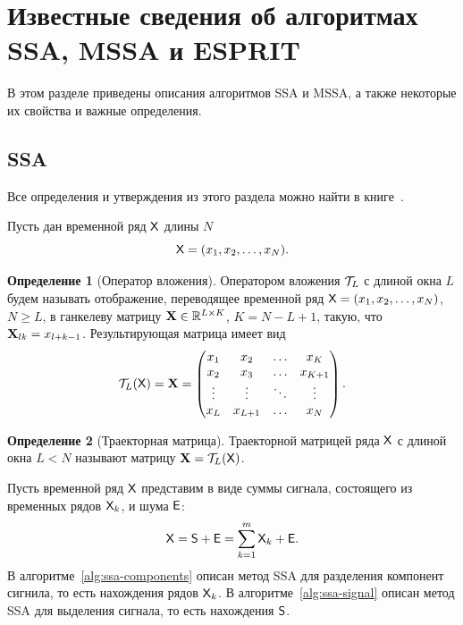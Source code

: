\documentclass[specialist,
  substylefile=spbu_report.rtx,
subf,href,colorlinks=true, 12pt]{disser}
\theoremstyle{plain}
\theoremstyle{definition}
\newtheorem{definition}{Определение}[section]
\theoremstyle{remark}
\begin{document}
\newpage

\section{Известные сведения об алгоритмах SSA, MSSA и
ESPRIT}\label{sec:known-results-ssa}
В этом разделе приведены описания алгоритмов SSA и MSSA, а также
некоторые их свойства и важные определения.

\subsection{SSA}\label{subsec:ssa}
Все определения и утверждения из этого раздела можно найти в книге~\cite{ssa}.

Пусть дан временной ряд $\mathsf{X}$ длины $N$
\[
  \mathsf{X}=(x_1,x_2,\ldots,x_N).
\]

\begin{definition}[Оператор вложения]
  \label{def:injection-op}
  Оператором вложения $\mathcal{T}_L$ с длиной окна $L$ будем называть
  отображение, переводящее временной ряд
  $\mathsf{X}=(x_1, x_2,\ldots, x_N)$, $N \geqslant L$, в ганкелеву матрицу
  $\mathbf{X}\in \mathbb{R}^{L \times K}$, $K = N-L+1$,
  такую, что $\mathbf{X}_{lk}=x_{l+k-1}$.
  Результирующая матрица имеет вид
  \[
    \mathcal{T}_L(\mathsf{X}) = \mathbf{X} =
    \begin{pmatrix}
      x_1    & x_2     & \ldots & x_K     \\
      x_2    & x_3     & \ldots & x_{K+1} \\
      \vdots & \vdots  & \ddots & \vdots  \\
      x_L    & x_{L+1} & \ldots & x_N
    \end{pmatrix}.
  \]
\end{definition}

\begin{definition}[Траекторная матрица]
  Траекторной матрицей ряда $\mathsf{X}$ с длиной окна $L<N$ называют
  матрицу $\mathbf{X}=\mathcal{T}_L(\mathsf{X})$.
\end{definition}

Пусть временной ряд $\mathsf{X}$ представим в виде суммы сигнала, состоящего
из временных рядов $\mathsf{X}_k$, и шума $\mathsf{E}$:
\[
  \mathsf{X} = \mathsf{S} + \mathsf{E} =\sum_{k=1}^{m} \mathsf{X}_k + \mathsf{E}.
\]
В алгоритме~\ref{alg:ssa-components} описан метод SSA для разделения
компонент сигнила, то есть
нахождения рядов $\mathsf{X}_k$.
В алгоритме~\ref{alg:ssa-signal} описан метод SSA для выделения
сигнала, то есть нахождения $\mathsf{S}$.
\end{document}
